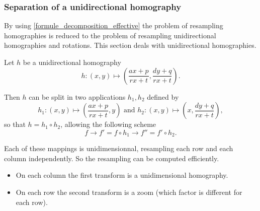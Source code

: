 \subsubsection{Separation of a unidirectional homography}

By using \eqref{formule_decomposition_effective} the problem of resampling homographies is reduced to the problem of resampling unidirectional homographies and rotations. This section deals with unidirectional homographies.



\label{homobox_paragraph}


Let $h$ be a unidirectional homography 
\begin{equation*}
h:(x,y)\mapsto \left(\frac{ax+p}{rx+t},\frac{dy+q}{rx+t}\right).
\end{equation*}

Then $h$ can be split in two applications $h_1 , h_2$ defined by
\begin{equation*}
h_1:(x,y) \mapsto \left(\frac{ax+p}{rx+t},y\right) \text{ and } h_2:(x,y) \mapsto \left(x,\frac{dy+q}{rx+t}\right),
\end{equation*}
so that $h=h_1  \circ h_2$, allowing the following scheme
\begin{equation*}
f\longrightarrow f'=f\circ h_1 \longrightarrow f''=f'\circ h_2.
\end{equation*}

Each of these mappings is unidimensionnal, resampling each row and each column independently. So the resampling can be computed efficiently.

\begin{itemize}
\item On each column the first transform is a unidimensional homography.%
\item On each row the second transform is a zoom (which factor is different for each row).%
\end{itemize}

